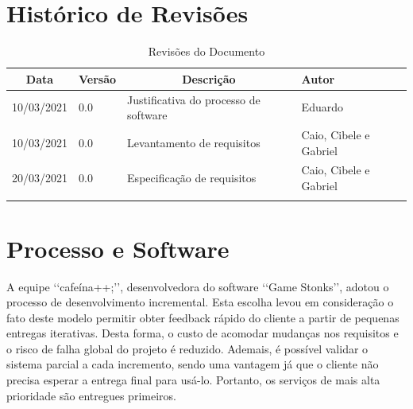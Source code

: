 \documentclass[a4paper, 12pt]{article}
\begin{document}
\newpage
{}

\section{Histórico de Revisões}

\begin{table}[!h]
\centering
\begin{tabular}{|l|l|l|l|}
\hline
\multicolumn{1}{|c|}{Data} & \multicolumn{1}{c|}{Versão} & \multicolumn{1}{c|}{Descrição}                 & Autor       \\ \hline
10/03/2021                 & 0.0                         & Justificativa do processo de software          & Eduardo     \\ \hline
10/03/2021                 & 0.0                         & Levantamento de requisitos                     & Caio, Cibele e Gabriel            \\ \hline 
20/03/2021                 & 0.0                         & Especificação de requisitos                     & Caio, Cibele e Gabriel            \\ \hline
                           &                             &                                                &             \\ \hline 
\end{tabular}
\caption{Revisões do Documento}
\label{tab:my-table}
\end{table}

\section{Processo e Software}

A equipe ‘‘cafeína++;’’, desenvolvedora do software ‘‘Game Stonks’’, adotou o processo de desenvolvimento incremental. Esta escolha levou em consideração o fato deste modelo permitir obter feedback rápido do cliente a partir de pequenas entregas iterativas. Desta forma, o custo de acomodar mudanças nos requisitos e o risco de falha global do projeto é reduzido. Ademais, é possível validar o sistema parcial a cada incremento, sendo uma vantagem já que o cliente não precisa esperar a entrega final para usá-lo. Portanto, os serviços de mais alta prioridade são entregues primeiros.
\end{document}
